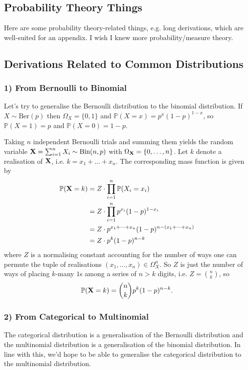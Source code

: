 \documentclass[11pt]{article}
\begin{document}
\newpage
\begin{appendices}

\section{Probability Theory Things}
Here are some probability theory-related things, e.g. long derivations, which are well-suited for an appendix. I wish I knew more probability/measure theory.

\subsection{Derivations Related to Common Distributions}

\subsubsection*{1) From Bernoulli to Binomial}
Let's try to generalise the Bernoulli distribution to the binomial distribution. If $X\sim\text{Ber}(p)$ then $\Omega_X=\{0,1\}$ and $\mathbb{P}(X=x)=p^x(1-p)^{1-x}$, so $\mathbb{P}(X=1)=p$ and $\mathbb{P}(X=0)=1-p$.

Taking $n$ independent Bernoulli trials and summing them yields the random variable $\mathbf{X}=\sum_{i=1}^nX_i\sim\text{Bin}(n,p)$ with $\Omega_{\mathbf{X}}=\{0,\dots,n\}$. Let $k$ denote a realisation of $\mathbf{X}$, i.e. $k=x_1+\dots+x_n$. The corresponding mass function is given by
\begin{align*}
    \mathbb{P}(\mathbf{X}=k)
    &=
    Z\cdot\prod_{i=1}^n\mathbb{P}(X_i=x_i)\\
    &=
    Z\cdot\prod_{i=1}^np^{x_i}(1-p)^{1-x_i}\\
    &=
    Z\cdot p^{x_1+\dots+x_n}(1-p)^{n-(x_1+\dots+x_n)}\\
    &=
    Z\cdot p^k(1-p)^{n-k}
\end{align*}
where $Z$ is a normalising constant accounting for the number of ways one can permute the tuple of realisations $(x_1,\dots,x_n)\in\Omega_{X}^n$. So $Z$ is just the number of ways of placing $k$-many $1$s among a series of $n>k$ digits, i.e. $Z=\binom{n}{k}$, so
$$
\mathbb{P}(\mathbf{X}=k)
=
\binom{n}{k}p^k(1-p)^{n-k}.
$$

\subsubsection*{2) From Categorical to Multinomial}
The categorical distribution is a generalisation of the Bernoulli distribution and the multinomial distribution is a generalisation of the binomial distribution. In line with this, we'd hope to be able to generalise the categorical distribution to the multinomial distribution.


\end{appendices}
\end{document}
